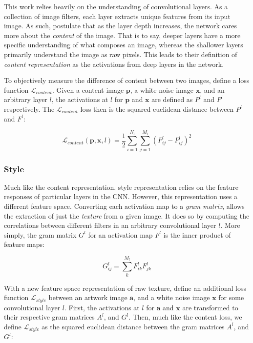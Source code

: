 \documentclass{article}
\begin{document}
This work relies heavily on the understanding of convolutional layers. As a
collection of image filters, each layer extracts unique features from its
input image. As such, \cite{2015arXiv150806576G} postulate that as the layer
depth increases, the network cares more about the \textit{content} of the
image. That is to say, deeper layers have a more specific understanding of
what composes an image, whereas the shallower layers primarily understand the
image as raw pixels. This leads to their definition of
\textit{content representation} as the activations from deep layers in the
network.

To objectively measure the difference of content between two images,
\cite{2015arXiv150806576G} define a loss function $\mathcal{L}_{content}$.
Given a content image $\textbf{p}$, a white noise image $\textbf{x}$, and an
arbitrary layer $l$, the activations at $l$ for $\textbf{p}$ and $\textbf{x}$
are defined as $P^l$ and $F^l$ respectively. The $\mathcal{L}_{content}$ loss
then is the squared euclidean distance between $P^l$ and $F^l$:

\begin{equation}
\mathcal{L}_{content}(\mathbf{p}, \mathbf{x}, l) =
\frac{1}{2} \sum_{i=1}^{N_l}\sum_{j=1}^{M_l}{(F^l_{ij} - P^l_{ij})^2}
\end{equation}

\subsubsection{Style}

Much like the content representation, style representation relies on the
feature responses of particular layers in the \ac{CNN}. However, this
representation uses a different feature space. Converting each activation
map to a \textit{gram matrix}, allows the extraction of just the
\textit{texture} from a given image. It does so by computing the correlations
between different filters in an arbitrary convolutional layer $l$. More
simply, the gram matrix $G^l$ for an activation map $F^l$ is the inner product
of feature maps:

\begin{equation}
G_{i j}^l = \sum_{k}^{M_l} F_{i k}^l F_{j k}^l
\end{equation}

With a new feature space representation of raw texture,
\cite{2015arXiv150806576G} define an additional loss function
$\mathcal{L}_{style}$ between an artwork image $\textbf{a}$, and a white noise
image $\textbf{x}$ for some convolutional layer $l$. First, the activations at
$l$ for $\textbf{a}$ and $\textbf{x}$ are transformed to their respective gram
matrices $A^l$, and $G^l$. Then, much like the content loss, we define
$\mathcal{L}_{style}$ as the squared euclidean distance between the gram
matrices $A^l$, and $G^l$:
\end{document}

